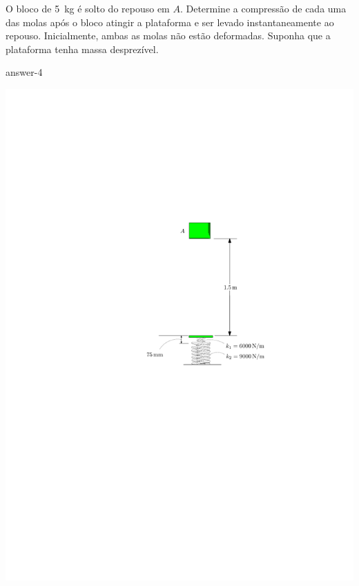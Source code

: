\vspace{2cm}
\item O bloco de \SI{5}{\kilogram} é solto do repouso em $A$. Determine a compressão de cada uma das molas após o bloco atingir a plataforma e ser levado instantaneamente ao repouso. Inicialmente, ambas as molas não estão deformadas. Suponha que a plataforma tenha massa desprezível.

{answer-4}

\vspace{-1cm}
\begin{flushright}
    \includegraphics[scale=1.2]{images/draw_4.pdf}
\end{flushright}